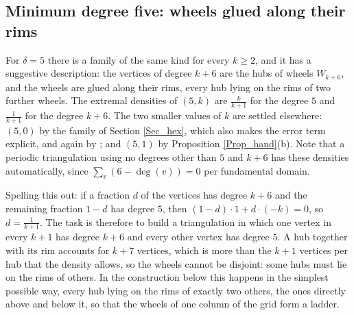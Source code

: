 \documentclass[10pt,a4paper]{article}
\begin{document}
\subsection{Minimum degree five: wheels glued along their rims}
\label{Sec_wheel}

For $\delta =5$ there is a family of the same kind for every $k\geq 2$, and it has a suggestive
description: the vertices of degree $k+6$
are the hubs of wheels $W_{k+6}$, and the wheels are glued along their rims, every hub lying on the rims of two
further wheels. The extremal densities of $(5,k)$ are $\frac{k}{k+1}$ for the degree $5$ and $\frac{1}{k+1}$ for the
degree $k+6$. The two smaller values of $k$ are settled elsewhere: $(5,0)$ by the family of Section \ref{Sec_hex},
which also makes the error term explicit, and again by \cite[Theorem 2.5]{CaroWest}; and $(5,1)$ by
Proposition \ref{Prop_hand}(b). Note that a periodic triangulation using no degrees other than $5$ and $k+6$ has these densities
automatically, since $\sum_{v}(6-\deg (v))=0$ per fundamental domain.

Spelling this out: if a fraction $d$ of the vertices has degree $k+6$ and the remaining fraction
$1-d$ has degree $5$, then $(1-d)\cdot 1+d\cdot (-k)=0$, so $d=\frac{1}{k+1}$. The task is therefore
to build a triangulation in which one vertex in every $k+1$ has degree $k+6$ and every other vertex
has degree $5$. A hub together with its rim accounts for $k+7$ vertices, which is more than the $k+1$
vertices per hub that the density allows, so the wheels cannot be disjoint: some hubs must lie on the
rims of others. In the construction below this happens in the simplest possible way, every hub lying
on the rims of exactly two others, the ones directly above and below it, so that the wheels of one
column of the grid form a ladder.
\end{document}
